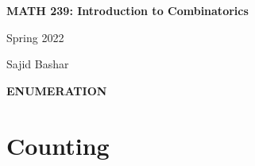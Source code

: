 \documentclass[11pt]{article}
\begin{document}
\makeatother
\parindent=0pt
\allowdisplaybreaks


\begin{titlepage}
   \begin{center}
       \vspace*{7cm}
       {\huge \textbf{MATH 239: Introduction to Combinatorics}}
       \vspace{0.25cm}
              
       {\Large{Spring 2022}}
       \vspace{1cm}
       
       {\Large{Sajid Bashar}}
       \vspace{1cm}

       
   \end{center}
\end{titlepage}
\begin{center}
    {\textbf{\Large{ENUMERATION}}}
\end{center}
\vspace{-20pt}
\section{Counting}
\end{document}
